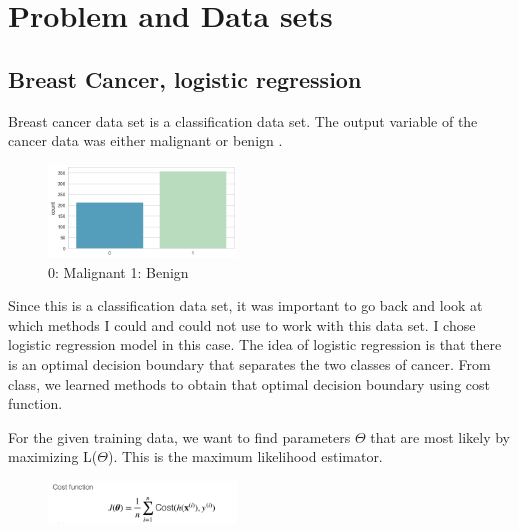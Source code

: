 \documentclass[conference]{IEEEtran}
\begin{document}
\section{Problem and Data sets}
\subsection{Breast Cancer, logistic regression}\label{AA}
Breast cancer data set is a classification data set. The output variable of the cancer data was either malignant or benign .

\begin{figure}[htbp]
\centerline{\includegraphics[width=50mm,scale=0.5]{imgs/output_16_1.png}}
\caption{0: Malignant 1: Benign}
\label{fig}
\end{figure}

Since this is a classification data set, it was important to go back and look at which methods I could and could not use to work with this data set. I chose logistic regression model in this case. The idea of logistic regression is that there is an optimal decision boundary that separates the two classes of cancer. From class, we learned methods to obtain that optimal decision boundary using cost function.

For the given training data, we want to find parameters $\Theta$ that are most likely by maximizing L($\Theta$). This is the maximum likelihood estimator.
\begin{figure}[htbp]
\centerline{\includegraphics[width=50mm,scale=0.5]{imgs/cost_func}}
\label{fig}
\end{figure}
\end{document}
